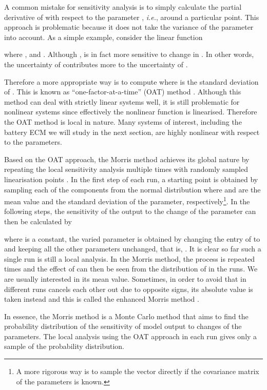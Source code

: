 \documentclass[letterpaper,twocolumn]{IEEEtran}
\begin{document}
A common mistake for sensitivity analysis is to simply calculate the partial derivative of  with respect to the  parameter , \emph{i.e.},  around a particular point. This approach is problematic because it does not take the variance of the parameter  into account. As a simple example, consider the linear function

where ,  and . Although ,  is in fact more sensitive to change in . In other words, the uncertainty of  contributes more to the uncertainty of .

Therefore a more appropriate way is to compute  where  is the standard deviation of . This is known as ``one-factor-at-a-time'' (OAT) method \cite{saltelli2006sensitivity}. Although this method can deal with strictly linear systems well, it is still problematic for nonlinear systems since effectively the nonlinear function  is linearised. Therefore the OAT method is local in nature. Many systems of interest, including the battery ECM we will study in the next section, are highly nonlinear with respect to the parameters.



Based on the OAT approach, the Morris method achieves its global nature by repeating the local sensitivity analysis multiple times with randomly sampled linearisation points \cite{morris1991factorial}. In the first step of each run, a starting point  is obtained by sampling each of the components  from the normal distribution  where  and  are the mean value and the  standard deviation of the  parameter, respectively\footnote{A more rigorous way is to sample the vector  directly if the covariance matrix of the parameters is known.}. In the following steps, the sensitivity of the output to the change of the  parameter can then be calculated by

where  is a constant, the varied parameter  is obtained by changing the  entry of  to  and keeping all the other parameters unchanged, that is, . It is clear so far such a single run is still a local analysis. In the Morris method, the process is repeated  times and the effect of  can then be seen from the distribution of  in the  runs. We are usually interested in its mean value. Sometimes, in order to avoid that  in different runs cancels each other out due to opposite signs, its absolute value is taken instead and this is called the enhanced Morris method \cite{campolongo2005enhancing}.

In essence, the Morris method is a Monte Carlo method that aims to find the probability distribution of the sensitivity of model output to changes of the parameters. The local analysis using the OAT approach in each run gives only a sample of the probability distribution.
\end{document}
